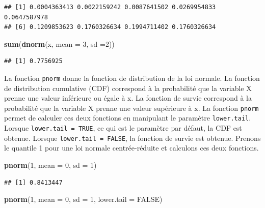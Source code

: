 \documentclass[
]{book}
\newenvironment{Shaded}{\begin{snugshade}}{\end{snugshade}}
\newcommand{\AttributeTok}[1]{\textcolor[rgb]{0.13,0.29,0.53}{#1}}
\newcommand{\ConstantTok}[1]{\textcolor[rgb]{0.56,0.35,0.01}{#1}}
\newcommand{\DecValTok}[1]{\textcolor[rgb]{0.00,0.00,0.81}{#1}}
\newcommand{\FunctionTok}[1]{\textcolor[rgb]{0.13,0.29,0.53}{\textbf{#1}}}
\newcommand{\NormalTok}[1]{#1}
\begin{document}
\begin{verbatim}
## [1] 0.0004363413 0.0022159242 0.0087641502 0.0269954833 0.0647587978
## [6] 0.1209853623 0.1760326634 0.1994711402 0.1760326634
\end{verbatim}

\begin{Shaded}
\begin{Highlighting}[]
\FunctionTok{sum}\NormalTok{(}\FunctionTok{dnorm}\NormalTok{(x, }\AttributeTok{mean =} \DecValTok{3}\NormalTok{, }\AttributeTok{sd =}\DecValTok{2}\NormalTok{))}
\end{Highlighting}
\end{Shaded}

\begin{verbatim}
## [1] 0.7756925
\end{verbatim}

La fonction \texttt{pnorm} donne la fonction de distribution de la loi normale. La fonction de distribution cumulative (CDF) correspond à la probabilité que la variable X prenne une valeur inférieure ou égale à x. La fonction de survie correspond à la probabilité que la variable X prenne une valeur supérieure à x. La fonction \texttt{pnorm} permet de calculer ces deux fonctions en manipulant le paramètre \texttt{lower.tail}. Lorsque \texttt{lower.tail\ =\ TRUE}, ce qui est le paramètre par défaut, la CDF est obtenue. Lorsque \texttt{lower.tail\ =\ FALSE}, la fonction de survie est obtenue. Prenons le quantile 1 pour une loi normale centrée-réduite et calculons ces deux fonctions.

\begin{Shaded}
\begin{Highlighting}[]
\FunctionTok{pnorm}\NormalTok{(}\DecValTok{1}\NormalTok{, }\AttributeTok{mean =} \DecValTok{0}\NormalTok{, }\AttributeTok{sd =} \DecValTok{1}\NormalTok{)}
\end{Highlighting}
\end{Shaded}

\begin{verbatim}
## [1] 0.8413447
\end{verbatim}

\begin{Shaded}
\begin{Highlighting}[]
\FunctionTok{pnorm}\NormalTok{(}\DecValTok{1}\NormalTok{, }\AttributeTok{mean =} \DecValTok{0}\NormalTok{, }\AttributeTok{sd =} \DecValTok{1}\NormalTok{, }\AttributeTok{lower.tail =} \ConstantTok{FALSE}\NormalTok{)}
\end{Highlighting}
\end{Shaded}
\end{document}
